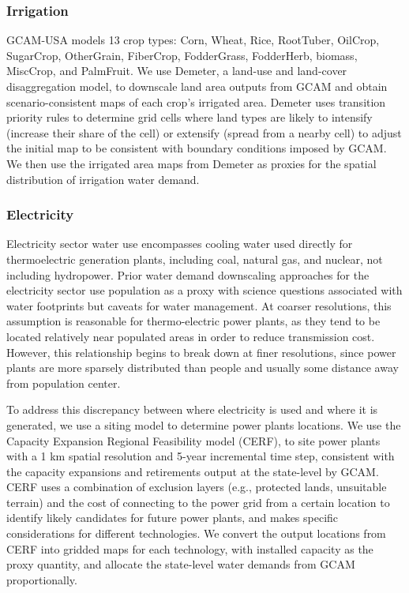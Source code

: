 \documentclass[fleqn,10pt]{wlscirep}
\begin{document}
\subsubsection*{Irrigation}

GCAM-USA models 13 crop types: Corn, Wheat, Rice, RootTuber, OilCrop, SugarCrop, OtherGrain, FiberCrop, FodderGrass, FodderHerb, biomass, MiscCrop, and PalmFruit. We use Demeter\cite{Vernon-2018}, a land-use and land-cover disaggregation model, to downscale land area outputs from GCAM and obtain scenario-consistent maps of each crop's irrigated area. Demeter uses transition priority rules to determine grid cells where land types are likely to intensify (increase their share of the cell) or extensify (spread from a nearby cell) to adjust the initial map to be consistent with boundary conditions imposed by GCAM. We then use the irrigated area maps from Demeter as proxies for the spatial distribution of irrigation water demand.

\subsubsection*{Electricity}
Electricity sector water use encompasses cooling water used directly for thermoelectric generation plants, including coal, natural gas, and nuclear, not including hydropower. Prior water demand downscaling approaches for the electricity sector use population as a proxy with science questions associated with water footprints but caveats for water management. At coarser resolutions, this assumption is reasonable for thermo-electric power plants, as they tend to be located relatively near populated areas in order to reduce transmission cost. However, this relationship begins to break down at finer resolutions, since power plants are more sparsely distributed than people and usually some distance away from population center.

To address this discrepancy between where electricity is used and where it is generated, we use a siting model to determine power plants locations. We use the Capacity Expansion Regional Feasibility model (CERF)\cite{Vernon2021}, to site power plants with a 1 km spatial resolution and 5-year incremental time step, consistent with the capacity expansions and retirements output at the state-level by GCAM. CERF uses a combination of exclusion layers (e.g., protected lands, unsuitable terrain) and the cost of connecting to the power grid from a certain location to identify likely candidates for future power plants, and makes specific considerations for different technologies. We convert the output locations from CERF into gridded maps for each technology, with installed capacity as the proxy quantity, and allocate the state-level water demands from GCAM proportionally.
\end{document}
